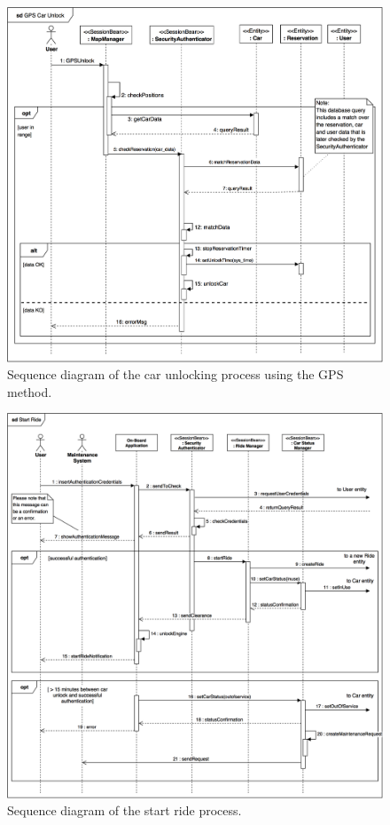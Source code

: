 \begin{figure}[H]
\begin{center}
		\includegraphics[width=\textwidth]{./arch_design/diagrams/gps_unlock_sd.png}
		\caption{Sequence diagram of the car unlocking process using the GPS method.}
		\label{gps_unlock_sd}
\end{center}
\end{figure}

\begin{figure}[H]
\begin{center}
		\includegraphics[width=\textwidth]{./arch_design/diagrams/start_ride_sd.png}
		\caption{Sequence diagram of the start ride process.}
		\label{start_ride_sd}
\end{center}
\end{figure}


